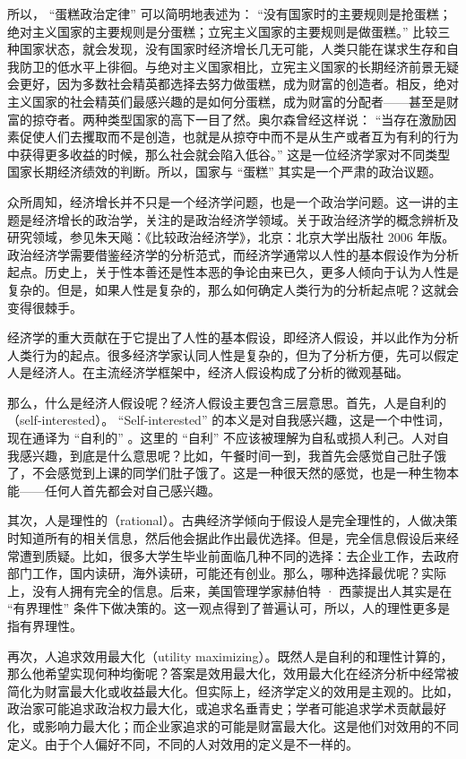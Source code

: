 所以， “蛋糕政治定律” 可以简明地表述为： “没有国家时的主要规则是抢蛋糕；绝对主义国家的主要规则是分蛋糕；立宪主义国家的主要规则是做蛋糕。” 比较三种国家状态，就会发现，没有国家时经济增长几无可能，人类只能在谋求生存和自我防卫的低水平上徘徊。与绝对主义国家相比，立宪主义国家的长期经济前景无疑会更好，因为多数社会精英都选择去努力做蛋糕，成为财富的创造者。相反，绝对主义国家的社会精英们最感兴趣的是如何分蛋糕，成为财富的分配者——甚至是财富的掠夺者。两种类型国家的高下一目了然。奥尔森曾经这样说： “当存在激励因素促使人们去攫取而不是创造，也就是从掠夺中而不是从生产或者互为有利的行为中获得更多收益的时候，那么社会就会陷入低谷。” 这是一位经济学家对不同类型国家长期经济绩效的判断。所以，国家与 “蛋糕” 其实是一个严肃的政治议题。


众所周知，经济增长并不只是一个经济学问题，也是一个政治学问题。这一讲的主题是经济增长的政治学，关注的是政治经济学领域。关于政治经济学的概念辨析及研究领域，参见朱天飚：《比较政治经济学》，北京：北京大学出版社 2006 年版。政治经济学需要借鉴经济学的分析范式，而经济学通常以人性的基本假设作为分析起点。历史上，关于性本善还是性本恶的争论由来已久，更多人倾向于认为人性是复杂的。但是，如果人性是复杂的，那么如何确定人类行为的分析起点呢？这就会变得很棘手。

经济学的重大贡献在于它提出了人性的基本假设，即经济人假设，并以此作为分析人类行为的起点。很多经济学家认同人性是复杂的，但为了分析方便，先可以假定人是经济人。在主流经济学框架中，经济人假设构成了分析的微观基础。

那么，什么是经济人假设呢？经济人假设主要包含三层意思。首先，人是自利的（self-interested）。 “Self-interested” 的本义是对自我感兴趣，这是一个中性词，现在通译为 “自利的” 。这里的 “自利” 不应该被理解为自私或损人利己。人对自我感兴趣，到底是什么意思呢？比如，午餐时间一到，我首先会感觉自己肚子饿了，不会感觉到上课的同学们肚子饿了。这是一种很天然的感觉，也是一种生物本能——任何人首先都会对自己感兴趣。

其次，人是理性的（rational）。古典经济学倾向于假设人是完全理性的，人做决策时知道所有的相关信息，然后他会据此作出最优选择。但是，完全信息假设后来经常遭到质疑。比如，很多大学生毕业前面临几种不同的选择：去企业工作，去政府部门工作，国内读研，海外读研，可能还有创业。那么，哪种选择最优呢？实际上，没有人拥有完全的信息。后来，美国管理学家赫伯特 · 西蒙提出人其实是在 “有界理性” 条件下做决策的。这一观点得到了普遍认可，所以，人的理性更多是指有界理性。

再次，人追求效用最大化（utility maximizing）。既然人是自利的和理性计算的，那么他希望实现何种均衡呢？答案是效用最大化，效用最大化在经济分析中经常被简化为财富最大化或收益最大化。但实际上，经济学定义的效用是主观的。比如，政治家可能追求政治权力最大化，或追求名垂青史；学者可能追求学术贡献最好化，或影响力最大化；而企业家追求的可能是财富最大化。这是他们对效用的不同定义。由于个人偏好不同，不同的人对效用的定义是不一样的。

